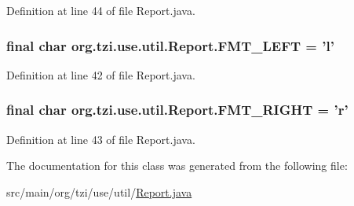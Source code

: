 Definition at line 44 of file Report.\-java.

\hypertarget{classorg_1_1tzi_1_1use_1_1util_1_1_report_a0c45ec7214f1ffe3737e6a06c31be5a5}{
\subsubsection[{F\-M\-T\-\_\-\-L\-E\-F\-T}]{\setlength{\rightskip}{0pt plus 5cm}final char org.\-tzi.\-use.\-util.\-Report.\-F\-M\-T\-\_\-\-L\-E\-F\-T = 'l'\hspace{0.3cm}{\ttfamily [static]}}}\label{classorg_1_1tzi_1_1use_1_1util_1_1_report_a0c45ec7214f1ffe3737e6a06c31be5a5}


Definition at line 42 of file Report.\-java.

\hypertarget{classorg_1_1tzi_1_1use_1_1util_1_1_report_aaed0521416ca2651e24a0fcf146110b2}{
\subsubsection[{F\-M\-T\-\_\-\-R\-I\-G\-H\-T}]{\setlength{\rightskip}{0pt plus 5cm}final char org.\-tzi.\-use.\-util.\-Report.\-F\-M\-T\-\_\-\-R\-I\-G\-H\-T = 'r'\hspace{0.3cm}{\ttfamily [static]}}}\label{classorg_1_1tzi_1_1use_1_1util_1_1_report_aaed0521416ca2651e24a0fcf146110b2}


Definition at line 43 of file Report.\-java.



The documentation for this class was generated from the following file\-:\begin{DoxyCompactItemize}
\item 
src/main/org/tzi/use/util/\hyperlink{_report_8java}{Report.\-java}\end{DoxyCompactItemize}
